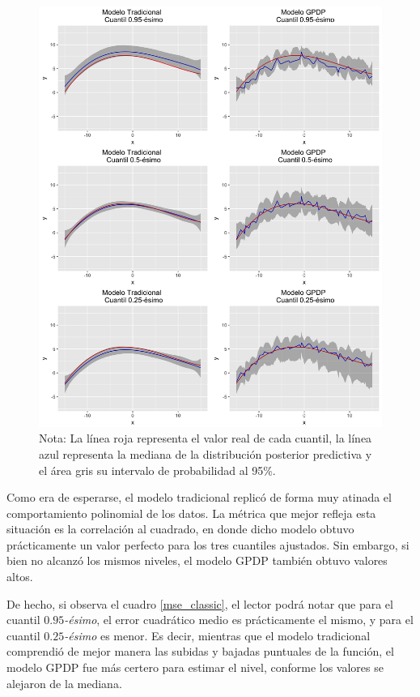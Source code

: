 \begin{figure}[htbp]
	\centering
	\caption{Ajuste de los modelos Tradicional y \textit{GPDP}, para un conjunto de datos que cumplen los supuestos tradicionales de regresi\'on.}
	\includegraphics[width=\textwidth]{Figures/Simulation/classic/predictions.png}
	\captionsetup{singlelinecheck=off,font=footnotesize}
    \caption*{Nota: La l\'inea roja representa el valor real de cada cuantil, la l\'inea azul representa la mediana de la distribuci\'on posterior predictiva y el \'area gris su intervalo de probabilidad al 95\%.}
	\label{models_classic}
\end{figure}

Como era de esperarse, el modelo tradicional replic\'o de forma muy atinada el comportamiento polinomial de los datos. La m\'etrica que mejor refleja esta situaci\'on es la correlaci\'on al cuadrado, en donde dicho modelo obtuvo pr\'acticamente un valor perfecto para los tres cuantiles ajustados. Sin embargo, si bien no alcanz\'o los mismos niveles, el modelo GPDP tambi\'en obtuvo valores altos.

De hecho, si observa el cuadro \ref{mse_classic}, el lector podr\'a notar que para el cuantil $0.95$\textit{-\'esimo}, el error cuadr\'atico medio es pr\'acticamente el mismo, y para el cuantil $0.25$\textit{-\'esimo} es menor. Es decir, mientras que el modelo tradicional comprendi\'o de mejor manera las subidas y bajadas puntuales de la funci\'on, el modelo GPDP fue m\'as certero para estimar el nivel, conforme los valores se alejaron de la mediana. 

